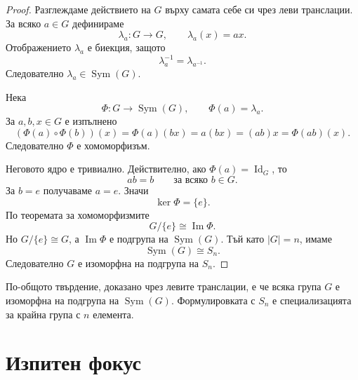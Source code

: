 \begin{proof}
Разглеждаме действието на $G$ върху самата себе си чрез леви транслации. За всяко $a\in G$ дефинираме
\[
\lambda_a\colon G\to G,
\qquad
\lambda_a(x)=ax.
\]
Отображението $\lambda_a$ е биекция, защото
\[
\lambda_a^{-1}=\lambda_{a^{-1}}.
\]
Следователно $\lambda_a\in\operatorname{Sym}(G)$.

Нека
\[
\Phi\colon G\to\operatorname{Sym}(G),
\qquad
\Phi(a)=\lambda_a.
\]
За $a,b,x\in G$ е изпълнено
\[
(\Phi(a)\circ\Phi(b))(x)
=
\Phi(a)(bx)
=
a(bx)
=
(ab)x
=
\Phi(ab)(x).
\]
Следователно $\Phi$ е хомоморфизъм.

Неговото ядро е тривиално. Действително, ако $\Phi(a)=\operatorname{Id}_G$, то
\[
ab=b
\qquad\text{за всяко }b\in G.
\]
За $b=e$ получаваме $a=e$. Значи
\[
\ker\Phi=\{e\}.
\]
По теоремата за хомоморфизмите
\[
G/\{e\}\cong\operatorname{Im}\Phi.
\]
Но $G/\{e\}\cong G$, а $\operatorname{Im}\Phi$ е подгрупа на $\operatorname{Sym}(G)$. Тъй като $|G|=n$, имаме
\[
\operatorname{Sym}(G)\cong S_n.
\]
Следователно $G$ е изоморфна на подгрупа на $S_n$.
\end{proof}

\begin{supp}[Бележка]
По-общото твърдение, доказано чрез левите транслации, е че всяка група $G$ е изоморфна на подгрупа на $\operatorname{Sym}(G)$. Формулировката с $S_n$ е специализацията за крайна група с $n$ елемента.
\end{supp}

\section{Изпитен фокус}\label{s:31.7}

